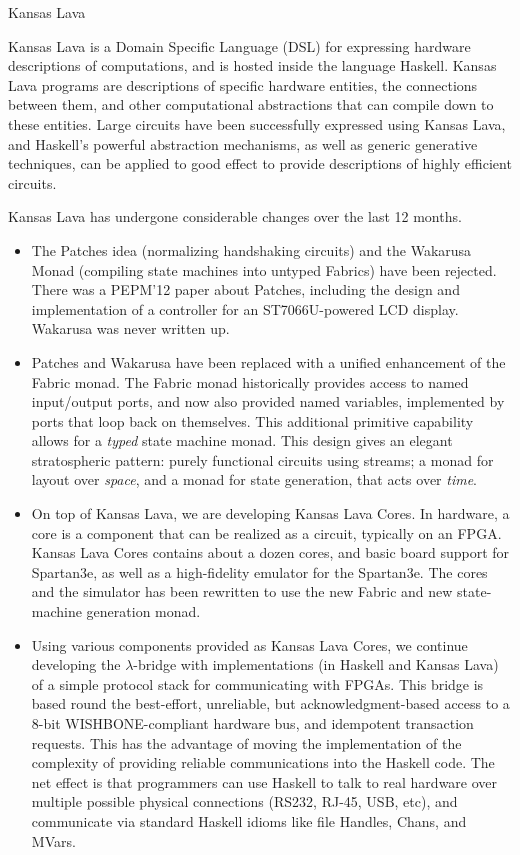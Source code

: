 \begin{hcarentry}[updated]{Kansas Lava}
\label{klava}
\makeheader

Kansas Lava is a Domain Specific Language (DSL) for expressing
hardware descriptions of computations, and is hosted inside the
language Haskell. Kansas Lava programs are descriptions of specific hardware
entities, the connections between them, and other computational abstractions
that can compile down to these entities. Large circuits have been successfully
expressed using Kansas Lava, and Haskell's powerful abstraction mechanisms, as
well as generic generative techniques, can be applied to good effect to provide
descriptions of highly efficient circuits.

Kansas Lava has undergone considerable changes over the last 12 months.
\begin{itemize}
\item The Patches idea (normalizing handshaking circuits) and the Wakarusa
Monad (compiling state machines into untyped Fabrics) have been rejected. There
was a PEPM'12 paper about Patches,
including the design and implementation of a controller for an ST7066U-powered
LCD display.
Wakarusa was never written up.

\item Patches and Wakarusa have been replaced with a unified enhancement of the Fabric
monad. The Fabric monad historically provides access to named input/output ports,
and now also provided named variables, implemented by ports that loop back on
themselves. This additional primitive capability allows for a {\em typed\/}
state machine monad.
This design gives an elegant stratospheric pattern: purely functional circuits using streams;
a monad for layout over {\em space\/}, and a monad for state generation,
that acts over {\em time\/}.

\item 
On top of Kansas Lava, we are developing Kansas Lava Cores.
In hardware, a core is a component
that can be realized as a circuit, typically on an FPGA. Kansas Lava Cores
contains about a dozen cores, and basic board support for Spartan3e,
as well as a high-fidelity emulator for the Spartan3e. The
cores and the simulator has been rewritten to use the new Fabric
and new state-machine generation monad.

\item Using various components provided as Kansas Lava Cores, 
we continue developing the $\lambda$-bridge 
with implementations (in Haskell and
Kansas Lava) of a simple protocol stack for communicating with FPGAs.
This bridge is based round the best-effort, unreliable,
but acknowledgment-based access to a 8-bit WISHBONE-compliant hardware bus,
and idempotent transaction requests.
This has the advantage of moving the implementation
of the complexity of providing reliable communications into the Haskell
code. The net effect is that programmers can use Haskell to
talk to real hardware over multiple possible physical connections
(RS232, RJ-45, USB, etc), and communicate via standard Haskell
idioms like file Handles, Chans, and MVars.


\end{itemize}
\end{hcarentry}

